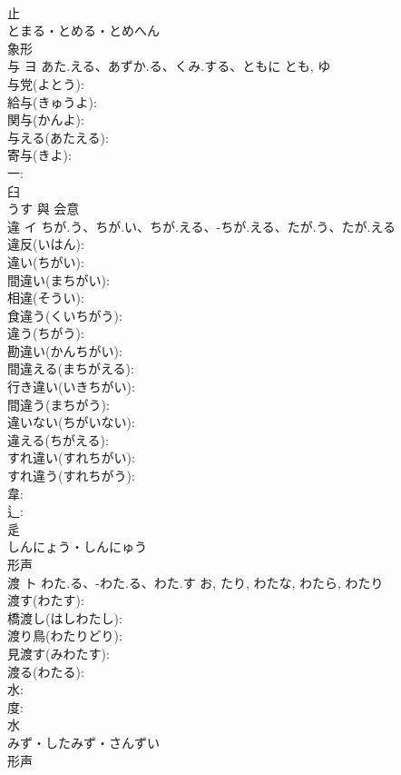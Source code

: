 \documentclass[8pt]{extreport}
\begin{document}
\begin{CJK}{UTF8}{min}
\\	止	
\\	とまる・とめる・とめへん	
\\	象形 
\\	与	ヨ	あた.える、あずか.る、くみ.する、ともに	とも, ゆ	
\\	与党(よとう): 
\\	給与(きゅうよ): 
\\	関与(かんよ): 
\\	与える(あたえる): 
\\	寄与(きよ): 
\\	一: 
\\	臼	
\\	うす	與	会意 
\\	違	イ	ちが.う、ちが.い、ちが.える、-ちが.える、たが.う、たが.える		
\\	違反(いはん): 
\\	違い(ちがい): 
\\	間違い(まちがい): 
\\	相違(そうい): 
\\	食違う(くいちがう): 
\\	違う(ちがう): 
\\	勘違い(かんちがい): 
\\	間違える(まちがえる): 
\\	行き違い(いきちがい): 
\\	間違う(まちがう): 
\\	違いない(ちがいない): 
\\	違える(ちがえる): 
\\	すれ違い(すれちがい): 
\\	すれ違う(すれちがう): 
\\	韋: 
\\	辶: 
\\	辵	
\\	しんにょう・しんにゅう	
\\	形声 
\\	渡	ト	わた.る、-わた.る、わた.す	お, たり, わたな, わたら, わたり	
\\	渡す(わたす): 
\\	橋渡し(はしわたし): 
\\	渡り鳥(わたりどり): 
\\	見渡す(みわたす): 
\\	渡る(わたる): 
\\	水: 
\\	度: 
\\	水	
\\	みず・したみず・さんずい	
\\	形声 

\end{CJK}
\end{document}
